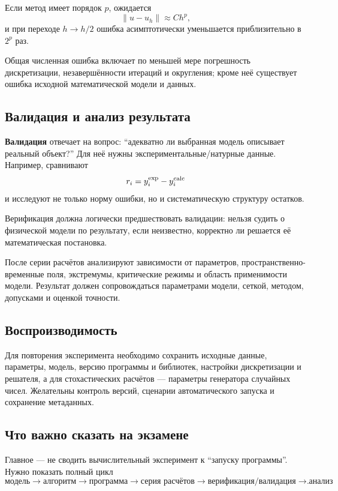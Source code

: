 Если метод имеет порядок $p$, ожидается
\[
\|u-u_h\|\approx Ch^p,
\]
и при переходе $h\to h/2$ ошибка асимптотически уменьшается приблизительно в $2^p$ раз.

Общая численная ошибка включает по меньшей мере погрешность дискретизации, незавершённости итераций и округления; кроме неё существует ошибка исходной математической модели и данных.

\subsection{Валидация и анализ результата}

\textbf{Валидация} отвечает на вопрос: ``адекватно ли выбранная модель описывает реальный объект?'' Для неё нужны экспериментальные/натурные данные. Например, сравнивают
\[
r_i=y_i^{\rm exp}-y_i^{\rm calc}
\]
и исследуют не только норму ошибки, но и систематическую структуру остатков.

Верификация должна логически предшествовать валидации: нельзя судить о физической модели по результату, если неизвестно, корректно ли решается её математическая постановка.

После серии расчётов анализируют зависимости от параметров, пространственно-временные поля, экстремумы, критические режимы и область применимости модели. Результат должен сопровождаться параметрами модели, сеткой, методом, допусками и оценкой точности.

\subsection{Воспроизводимость}

Для повторения эксперимента необходимо сохранить исходные данные, параметры, модель, версию программы и библиотек, настройки дискретизации и решателя, а для стохастических расчётов --- параметры генератора случайных чисел. Желательны контроль версий, сценарии автоматического запуска и сохранение метаданных.

\subsection{Что важно сказать на экзамене}

Главное --- не сводить вычислительный эксперимент к ``запуску программы''. Нужно показать полный цикл
\[
\boxed{
\text{модель}
\rightarrow
\text{алгоритм}
\rightarrow
\text{программа}
\rightarrow
\text{серия расчётов}
\rightarrow
\text{верификация/валидация}
\rightarrow
\text{анализ}}.
\]

\newpage
